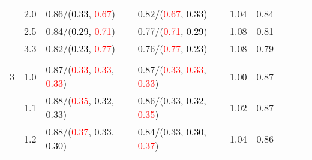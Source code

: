\documentclass[10pt,a4paper]{report}
\begin{document}
\begin{table}[!htbp]
\begin{center}
{\begin{tabular}{ccllccccc}
				  & 2.0                               & 0.86/(\textcolor{black}{0.33}, \textcolor{red}{0.67})                                                                                           & 0.82/(\textcolor{red}{0.67}, \textcolor{black}{0.33})                                                                                           & 1.04             & 0.84                     \\
				  & 2.5                               & 0.84/(\textcolor{black}{0.29}, \textcolor{red}{0.71})                                                                                           & 0.77/(\textcolor{red}{0.71}, \textcolor{black}{0.29})                                                                                           & 1.08             & 0.81                     \\
				  & 3.3                               & 0.82/(\textcolor{black}{0.23}, \textcolor{red}{0.77})                                                                                           & 0.76/(\textcolor{red}{0.77}, \textcolor{black}{0.23})                                                                                           & 1.08             & 0.79                     \\
				  &                                   &                                                                                                                                                 &                                                                                                                                                 &                                             \\
				3 & 1.0                               & 0.87/(\textcolor{red}{0.33}, \textcolor{red}{0.33}, \textcolor{red}{0.33})                                                                      & 0.87/(\textcolor{red}{0.33}, \textcolor{red}{0.33}, \textcolor{red}{0.33})                                                                      & 1.00             & 0.87                     \\
				  & 1.1                               & 0.88/(\textcolor{red}{0.35}, \textcolor{black}{0.32}, 0.33)                                                                                     & 0.86/(0.33, \textcolor{black}{0.32}, \textcolor{red}{0.35})                                                                                     & 1.02             & 0.87                     \\
				  & 1.2                               & 0.88/(\textcolor{red}{0.37}, 0.33, \textcolor{black}{0.30})                                                                                     & 0.84/(0.33, \textcolor{black}{0.30}, \textcolor{red}{0.37})                                                                                     & 1.04             & 0.86                     \\

\end{tabular}}
\end{center}
\end{table}
\end{document}

